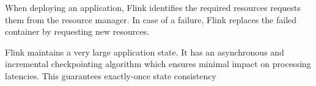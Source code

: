 When deploying an application, Flink identifies the required resources requests them from the resource manager. In case of a failure, Flink replaces the failed container by requesting new resources. 

Flink maintains a very large application state. It has an asynchronous and incremental checkpointing algorithm which ensures minimal impact on processing latencies. 
This guarantees exactly-once state consistency

